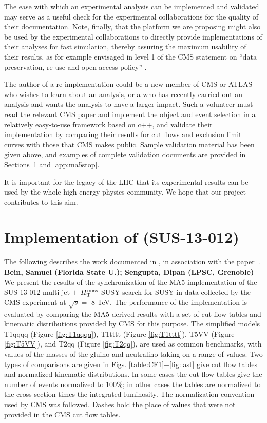 The ease with which an experimental analysis can be implemented and validated may serve as a useful check for the experimental collaborations for the quality of their documentation. Note, finally, that the platform we are pro\-posing might also be used by the experimental collaborations to directly provide implementations of their analyses for fast simulation, thereby assuring the maximum usability of their results, as for example envisaged in level 1 of the CMS statement on ``data preservation, re-use and open access policy'' \cite{CMS:DataPolicy}. 

The author of a re-implementation could be a new member of CMS or ATLAS who wishes to learn about an analysis, or a who has recently carried out an analysis and wants the analysis to have a larger impact. Such a volunteer must read the relevant CMS paper and implement the object and event selection in a relatively easy-to-use framework based on c++, and validate their implementation by comparing their results for cut flows and exclusion limit curves with those that CMS makes public. Sample validation material has been given above, and examples of complete validation documents are provided in Sections~\ref{app:ma5multijet} and \ref{app:ma5stop}.

It is important for the legacy of the LHC that its experimental results can be used by the whole high-energy physics community. We hope that our project contributes to this aim. 

\section{Implementation of (SUS-13-012)}
\label{app:ma5multijet}
The following describes the work documented in \cite{MA5-CMS-SUS-13-012}, in association with the paper~\cite{MA5-CMS-SUS-13-012}.
\textbf{Bein, Samuel (Florida State U.); Sengupta, Dipan (LPSC, Grenoble)}\\
We present the results of the synchronization of the MA5
implementation of the SUS-13-012 multi-jet $+$ $H_{\text{T}}^{\rm miss}$ SUSY search for SUSY in data collected 
by the CMS experiment at $\sqrt{s}=$ 8 TeV.  The
performance of the implementation is evaluated by comparing the
MA5-derived results with a set of cut flow tables and kinematic
distributions provided by CMS for this purpose. The simplified models
T1qqqq (Figure \ref{fig:T1qqqq}), T1tttt (Figure \ref{fig:T1tttt}), T5VV (Figure \ref{fig:T5VV}), and T2qq (Figure \ref{fig:T2qq}), are used as common benchmarks, with values of the masses of the
gluino and neutralino taking on a range of values. Two types of
comparisons are given in Figs. \ref{table:CF1}$-$\ref{fig:last} give cut flow tables and normalized
kinematic distributions. In some cases the
cut flow tables give the number of events normalized to 100\%; in
other cases the tables are normalized to the cross section times the
integrated luminosity. The normalization convention used by CMS was
followed. Dashes hold the place of values that were not
provided in the CMS cut flow tables. 

